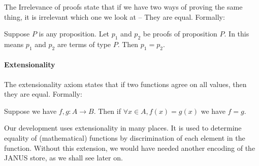 The Irrelevance of proofs state that if we have two ways of proving
the same thing, it is irrelevant which one we look at -- They are
equal. Formally:
\begin{axm}
  Suppose $P$ is any proposition. Let $p_1$ and $p_2$ be proofs of
  proposition $P$. In \coq{} this means $p_1$ and $p_2$ are terms of
  type $P$. Then $p_1 = p_2$.
\end{axm}

\paragraph{Extensionality}
\label{coqext:extensionality}

The extensionality axiom states that if two functions agree on all
values, then they are equal. Formally:
\begin{axm}
  Suppose we have $f, g \colon A \to B$. Then if $\forall x \in A,
  f(x) = g(x)$ we have $f = g$.
\end{axm}
Our development uses extensionality in many places. It is used to
determine equality of (mathematical) functions by discrimination of
each element in the function. Without this extension, we would have
needed another encoding of the JANUS store, as we shall see later
on.

